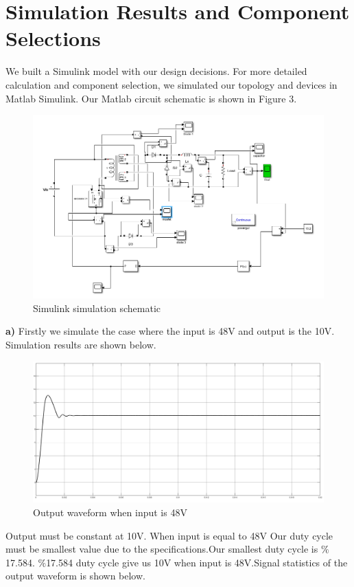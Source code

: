 \documentclass{article}
\newcommand\tab[1][1cm]{\hspace*{#1}}
\begin{document}
\section*{Simulation Results and Component Selections}
\tab We built a Simulink model with our design decisions. For more detailed calculation and component selection, we simulated our topology and devices in Matlab Simulink. Our Matlab circuit schematic is shown in Figure 3. 
\begin{figure}[H]
    \centering
    \includegraphics[scale=0.4]{circuit.PNG}
    \caption{Simulink simulation schematic}
    \label{fig:my_label}
\end{figure}
\tab\textbf{a)} Firstly we simulate the case where the input is 48V and output is the 10V. Simulation results are shown below. 
\begin{figure}[H]
    \centering
    \includegraphics[scale=0.3]{48in.png}
    \caption{Output waveform when input is 48V}
    \label{fig:my_label}
\end{figure}
\newline
\tab Output must be constant at 10V. When input is equal to 48V Our duty cycle must be smallest value due to the specifications.Our smallest duty cycle is $\%$17.584.  $\%$17.584 duty cycle give us 10V when input is 48V.Signal statistics of the output waveform is shown below.
\end{document}
